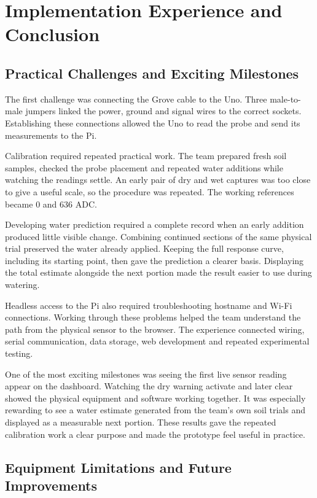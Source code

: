 \documentclass[11pt,a4paper]{article}
\begin{document}
\section{Implementation Experience and Conclusion}

\subsection{Practical Challenges and Exciting Milestones}

The first challenge was connecting the Grove cable to the Uno. Three male-to-male jumpers linked the power, ground and signal wires to the correct sockets. Establishing these connections allowed the Uno to read the probe and send its measurements to the Pi.

Calibration required repeated practical work. The team prepared fresh soil samples, checked the probe placement and repeated water additions while watching the readings settle. An early pair of dry and wet captures was too close to give a useful scale, so the procedure was repeated. The working references became 0 and 636 ADC.

Developing water prediction required a complete record when an early addition produced little visible change. Combining continued sections of the same physical trial preserved the water already applied. Keeping the full response curve, including its starting point, then gave the prediction a clearer basis. Displaying the total estimate alongside the next portion made the result easier to use during watering.

Headless access to the Pi also required troubleshooting hostname and Wi-Fi connections. Working through these problems helped the team understand the path from the physical sensor to the browser. The experience connected wiring, serial communication, data storage, web development and repeated experimental testing.

One of the most exciting milestones was seeing the first live sensor reading appear on the dashboard. Watching the dry warning activate and later clear showed the physical equipment and software working together. It was especially rewarding to see a water estimate generated from the team's own soil trials and displayed as a measurable next portion. These results gave the repeated calibration work a clear purpose and made the prototype feel useful in practice.

\subsection{Equipment Limitations and Future Improvements}
\end{document}
